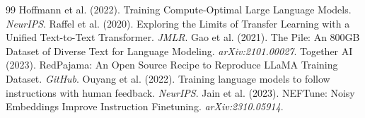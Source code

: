 \documentclass[11pt,a4paper]{article}
\begin{document}

\begin{thebibliography}{99}
 Hoffmann et al. (2022). Training Compute-Optimal Large Language Models. \textit{NeurIPS}.
 Raffel et al. (2020). Exploring the Limits of Transfer Learning with a Unified Text-to-Text Transformer. \textit{JMLR}.
 Gao et al. (2021). The Pile: An 800GB Dataset of Diverse Text for Language Modeling. \textit{arXiv:2101.00027}.
 Together AI (2023). RedPajama: An Open Source Recipe to Reproduce LLaMA Training Dataset. \textit{GitHub}.
 Ouyang et al. (2022). Training language models to follow instructions with human feedback. \textit{NeurIPS}.
 Jain et al. (2023). NEFTune: Noisy Embeddings Improve Instruction Finetuning. \textit{arXiv:2310.05914}.
\end{thebibliography}
\end{document}
